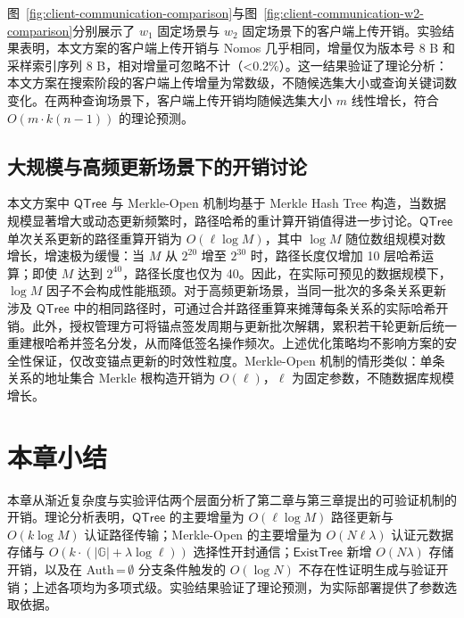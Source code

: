 图~\ref{fig:client-communication-comparison}与图~\ref{fig:client-communication-w2-comparison}分别展示了 $w_1$ 固定场景与 $w_2$ 固定场景下的客户端上传开销。实验结果表明，本文方案的客户端上传开销与 Nomos 几乎相同，增量仅为版本号 8 B 和采样索引序列 8 B，相对增量可忽略不计（<0.2\%）。这一结果验证了理论分析：本文方案在搜索阶段的客户端上传增量为常数级，不随候选集大小或查询关键词数变化。在两种查询场景下，客户端上传开销均随候选集大小 $m$ 线性增长，符合 $O(m \cdot k(n-1))$ 的理论预测。

\subsection{大规模与高频更新场景下的开销讨论}\label{sec:scalability-discussion}

本文方案中 $\mathsf{QTree}$ 与 Merkle-Open 机制均基于 Merkle Hash Tree 构造，当数据规模显著增大或动态更新频繁时，路径哈希的重计算开销值得进一步讨论。$\mathsf{QTree}$ 单次关系更新的路径重算开销为 $O(\ell\log M)$，其中 $\log M$ 随位数组规模对数增长，增速极为缓慢：当 $M$ 从 $2^{20}$ 增至 $2^{30}$ 时，路径长度仅增加 10 层哈希运算；即使 $M$ 达到 $2^{40}$，路径长度也仅为 40。因此，在实际可预见的数据规模下，$\log M$ 因子不会构成性能瓶颈。对于高频更新场景，当同一批次的多条关系更新涉及 $\mathsf{QTree}$ 中的相同路径时，可通过合并路径重算来摊薄每条关系的实际哈希开销。此外，授权管理方可将锚点签发周期与更新批次解耦，累积若干轮更新后统一重建根哈希并签名分发，从而降低签名操作频次。上述优化策略均不影响方案的安全性保证，仅改变锚点更新的时效性粒度。Merkle-Open 机制的情形类似：单条关系的地址集合 Merkle 根构造开销为 $O(\ell)$，$\ell$ 为固定参数，不随数据库规模增长。

\section{本章小结}

本章从渐近复杂度与实验评估两个层面分析了第二章与第三章提出的可验证机制的开销。理论分析表明，$\mathsf{QTree}$ 的主要增量为 $O(\ell\log M)$ 路径更新与 $O(k\log M)$ 认证路径传输；Merkle-Open 的主要增量为 $O(N\ell\lambda)$ 认证元数据存储与 $O(k\cdot(|\mathbb{G}|+\lambda\log\ell))$ 选择性开封通信；$\mathsf{ExistTree}$ 新增 $O(N\lambda)$ 存储开销，以及在 Auth\,=\,$\emptyset$ 分支条件触发的 $O(\log N)$ 不存在性证明生成与验证开销；上述各项均为多项式级。实验结果验证了理论预测，为实际部署提供了参数选取依据。

